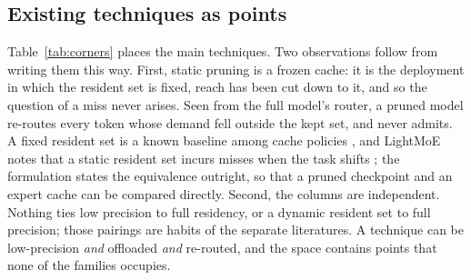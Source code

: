 \documentclass[11pt]{article}
\begin{document}
\subsection{Existing techniques as points}


Table~\ref{tab:corners} places the main techniques. Two observations follow from writing them
this way. First, static pruning is a frozen cache: it is the deployment in which the resident set is
fixed, reach has been cut down to it, and so the question of a miss never arises. Seen from the
full model's router, a pruned model re-routes every token whose demand fell outside the kept
set, and never admits. A fixed resident set is a known baseline among cache policies
\citep{zhang2026reproducible,bacon2026fewer}, and LightMoE notes that a static resident set incurs
misses when the task shifts \citep{luo2026lightmoe}; the formulation states the equivalence outright, so that a pruned checkpoint and an expert cache can be compared directly. Second, the columns are independent. Nothing ties low precision to full
residency, or a dynamic resident set to full precision; those pairings are habits of the
separate literatures. A technique can be low-precision \emph{and} offloaded \emph{and} re-routed,
and the space contains points that none of the families occupies.
\end{document}
